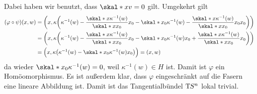 Dabei haben wir benutzt, dass $\skal*{x}{v}=0$ gilt. Umgekehrt gilt
\begin{align*}
	(\varphi \circ \psi)(x,w) &= \enbrace*{x , \kappa \enbrace*{\kappa^{-1}(w) - \frac{\skal*{x}{\kappa^{-1}(w)}}{\skal*{x}{x_0}}x_0 - \skal*{x_0}{\kappa^{-1}(w) - 
	\frac{\skal*{x}{\kappa^{-1}(w)}}{\skal*{x}{x_0}}x_0} x_0 } } \\
	&= \enbrace*{x , \kappa \enbrace*{\kappa^{-1}(w) - \frac{\skal*{x}{\kappa^{-1}(w)}}{\skal*{x}{x_0}}x_0 - 
	\skal*{x_0}{\kappa^{-1}(w)} x_0 + \frac{\skal*{x}{\kappa^{-1}(w)}}{\skal*{x}{x_0}} x_0 }}\\
	&= \enbrace[\Big]{x , \kappa \enbrace*{\kappa^{-1}(w) - \skal*{x_0}{\kappa^{-1}(w)} x_0} } = (x,w)
\end{align*}
da wieder $\skal*{x_0}{\kappa ^{-1}(w)}=0$, weil $\kappa ^{-1}(w) \in H$ ist. Damit ist $\varphi$ ein Homöomorphismus. Es ist außerdem klar, dass $\varphi$ eingeschränkt auf 
die Fasern eine lineare Abbildung ist. Damit ist das Tangentialbündel $\mathrm{T}\mkern-0.85mu S^n$ lokal trivial. \bewende








\cleardoubleoddemptypage
{}
\setcounter{page}{1}

\printindex
\listoffigures
\todototoc
{}

